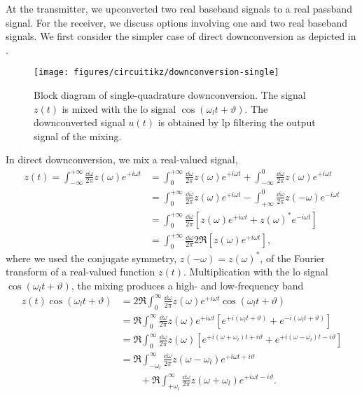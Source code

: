 At the transmitter, we upconverted two real baseband signals to a real passband signal.
For the receiver, we discuss options involving one and two real baseband signals.
We first consider the simpler case of direct downconversion as depicted in .
\begin{figure}[htb]
	\centering
	\texttt{[image: figures/circuitikz/downconversion-single]}
	\caption{Block diagram of single-quadrature downconversion. The signal $z(t)$ is mixed with the \gls{lo} signal $\cos(\omega_lt+\vartheta)$. The downconverted signal $u(t)$ is obtained by \gls{lp} filtering the output signal of the mixing.}\label{fig:downconversion_single}
\end{figure}
In direct downconversion, we mix a real-valued signal,
\begin{equation}
	\begin{split}
		z(t)
		=
		\int_{-\infty}^{+\infty}\frac{\dd{\omega}}{2\pi}
		z(\omega)
		e^{+i\omega t}
		&=
		\int_0^{+\infty}\frac{\dd{\omega}}{2\pi}
		z(\omega)
		e^{+i\omega t}
		+
		\int_{-\infty}^0\frac{\dd{\omega}}{2\pi}
		z(\omega)
		e^{+i\omega t}
		\\
		&=
		\int_0^{+\infty}\frac{\dd{\omega}}{2\pi}
		z(\omega)
		e^{+i\omega t}
		-
		\int_{+\infty}^0\frac{\dd{\omega}}{2\pi}
		z(-\omega)
		e^{-i\omega t}
		\\
		&=
		\int_0^{+\infty}\frac{\dd{\omega}}{2\pi}
		\left[
			z(\omega)
			e^{+i\omega t}
			+
			z(\omega)^*
			e^{-i\omega t}
		\right]
		\\
		&=
		\int_0^{+\infty}\frac{\dd{\omega}}{2\pi}
		2\Re\left[
			z(\omega)
			e^{+i\omega t}
		\right]
		,
	\end{split}
\end{equation}
where we used the conjugate symmetry, $z(-\omega)=z(\omega)^*$, of the Fourier transform of a real-valued function $z(t)$.
Multiplication with the \gls{lo} signal $\cos(\omega_lt+\vartheta)$, the mixing produces a high- and low-frequency band
\begin{equation}
	\begin{split}
		z(t)
		\cos(\omega_lt+\vartheta)
		&=
		2\Re
		\int_0^\infty\frac{\dd{\omega}}{2\pi}
		z(\omega)
		e^{+i\omega t}
		\cos(\omega_lt+\vartheta)
		\\
		&=
		\Re
		\int_0^\infty\frac{\dd{\omega}}{2\pi}
		z(\omega)
		e^{+i\omega t}
		\left[
			e^{+i(\omega_lt+\vartheta)}
			+
			e^{-i(\omega_lt+\vartheta)}
		\right]
		\\
		&=
		\Re
		\int_0^\infty\frac{\dd{\omega}}{2\pi}
		z(\omega)
		\left[
			e^{+i(\omega+\omega_l)t+i\vartheta}
			+
			e^{+i(\omega-\omega_l)t-i\vartheta}
		\right]
		\\
		&=
		\Re
		\int_{-\omega_l}^\infty\frac{\dd{\omega}}{2\pi}
		z(\omega-\omega_l)
		e^{+i\omega t+i\vartheta}
		\\
		&\qquad+
		\Re
		\int_{+\omega_l}^\infty\frac{\dd{\omega}}{2\pi}
		z(\omega+\omega_l)
		e^{+i\omega t-i\vartheta}
		.
	\end{split}
\end{equation}
